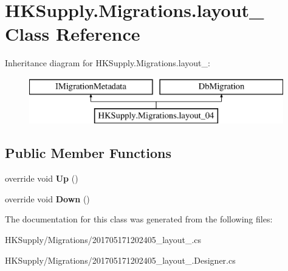 \hypertarget{class_h_k_supply_1_1_migrations_1_1layout__04}{}\section{H\+K\+Supply.\+Migrations.\+layout\+\_ Class Reference}
\label{class_h_k_supply_1_1_migrations_1_1layout__04}
Inheritance diagram for H\+K\+Supply.\+Migrations.\+layout\+\_\+:\begin{figure}[H]
\begin{center}
\leavevmode
\includegraphics[height=2.000000cm]{class_h_k_supply_1_1_migrations_1_1layout__04}
\end{center}
\end{figure}
\subsection*{Public Member Functions}
\begin{DoxyCompactItemize}
\item 
\mbox{\label{class_h_k_supply_1_1_migrations_1_1layout__04_aaf16c84b3b6fdd25ad95abc85cbb4bcf}} 
override void {\bfseries Up} ()
\item 
\mbox{\label{class_h_k_supply_1_1_migrations_1_1layout__04_aa352334e324d1deb168ccc03c3c56423}} 
override void {\bfseries Down} ()
\end{DoxyCompactItemize}


The documentation for this class was generated from the following files\+:\begin{DoxyCompactItemize}
\item 
H\+K\+Supply/\+Migrations/201705171202405\+\_\+layout\+\_.\+cs\item 
H\+K\+Supply/\+Migrations/201705171202405\+\_\+layout\+\_.\+Designer.\+cs\end{DoxyCompactItemize}
